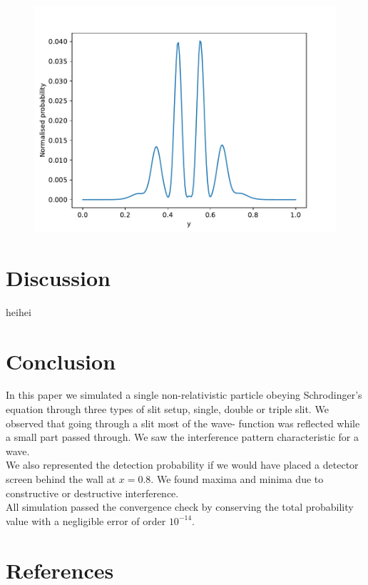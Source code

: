 \documentclass[english,notitlepage,reprint,nofootinbib]{revtex4-2}  %
\begin{document}
	\begin{figure}[h!]
		\centering
		\includegraphics[scale=0.55]{figures/triple_slit_detection.pdf}
		\caption{}
		\label{fig:prob9_triple}
	\end{figure}

	\section{Discussion}\label{sec:discussion}
		heihei
	\section{Conclusion}\label{sec:conclusion}
	
	In this paper we simulated a single non-relativistic particle obeying 
	Schrodinger's equation through three types of slit setup, single, double
	or triple slit. We observed that going through a slit most of the wave-
	function was reflected while a small part passed through. We saw the 
	interference pattern characteristic for a wave. \\
	
	We also represented the detection probability if we would have placed 
	a detector screen behind the wall at $x=0.8$. We found maxima and 
	minima due to constructive or destructive interference. \\
	
	All simulation passed the convergence check by conserving the total 
	probability value with a negligible error of order  $10^{-14}$. \\
	
	
	
	\onecolumngrid
	\section*{References}
	
	
	
\end{document}
